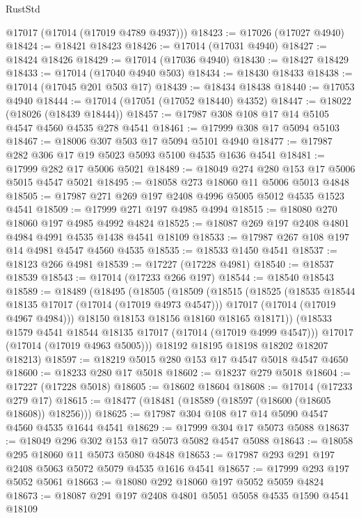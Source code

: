 \begin{lexlean}{RustStd}
\begin{coremodule}
      @17017
      (@17014 (@17019 @4789 @4937)))
@18423 := @17026 (@17027 @4940)
@18424 := @18421 @18423
@18426 := @17014 (@17031 @4940)
@18427 := @18424 @18426
@18429 := @17014 (@17036 @4940)
@18430 := @18427 @18429
@18433 := @17014 (@17040 @4940 @503)
@18434 := @18430 @18433
@18438 := @17014 (@17045 @201 @503 @17)
@18439 := @18434 @18438
@18440 := @17053 @4940
@18444 := @17014 (@17051 (@17052 @18440) @4352)
@18447 := @18022 (@18026 (@18439 @18444))
@18457 := @17987 @308 @108 @17 @14 @5105 @4547 @4560 @4535 @278 @4541
@18461 := @17999 @308 @17 @5094 @5103
@18467 := @18006 @307 @503 @17 @5094 @5101 @4940
@18477 := @17987 @282 @306 @17 @19 @5023 @5093 @5100 @4535 @1636 @4541
@18481 := @17999 @282 @17 @5006 @5021
@18489 := @18049 @274 @280 @153 @17 @5006 @5015 @4547 @5021
@18495 := @18058 @273 @18060 @11 @5006 @5013 @4848
@18505 := @17987 @271 @269 @197 @2408 @4996 @5005 @5012 @4535 @1523 @4541
@18509 := @17999 @271 @197 @4985 @4994
@18515 := @18080 @270 @18060 @197 @4985 @4992 @4824
@18525 := @18087 @269 @197 @2408 @4801 @4984 @4991 @4535 @1438 @4541 @18109
@18533 := @17987 @267 @108 @197 @14 @4981 @4547 @4560 @4535
@18535 := @18533 @1450 @4541
@18537 := @18123 @266 @4981
@18539 := @17227 (@17228 @4981)
@18540 := @18537 @18539
@18543 := @17014 (@17233 @266 @197)
@18544 := @18540 @18543
@18589 := @18489
    (@18495
      (@18505
        (@18509
          (@18515
            (@18525
              (@18535 @18544 @18135 @17017 (@17014 (@17019 @4973 @4547)))
              @17017
              (@17014 (@17019 @4967 @4984)))
            @18150
            @18153
            @18156
            @18160
            @18165
            @18171))
        (@18533 @1579 @4541 @18544 @18135 @17017 (@17014 (@17019 @4999 @4547)))
        @17017
        (@17014 (@17019 @4963 @5005)))
      @18192
      @18195
      @18198
      @18202
      @18207
      @18213)
@18597 := @18219 @5015 @280 @153 @17 @4547 @5018 @4547 @4650
@18600 := @18233 @280 @17 @5018
@18602 := @18237 @279 @5018
@18604 := @17227 (@17228 @5018)
@18605 := @18602 @18604
@18608 := @17014 (@17233 @279 @17)
@18615 := @18477 (@18481 (@18589 (@18597 (@18600 (@18605 @18608)) @18256)))
@18625 := @17987 @304 @108 @17 @14 @5090 @4547 @4560 @4535 @1644 @4541
@18629 := @17999 @304 @17 @5073 @5088
@18637 := @18049 @296 @302 @153 @17 @5073 @5082 @4547 @5088
@18643 := @18058 @295 @18060 @11 @5073 @5080 @4848
@18653 := @17987 @293 @291 @197 @2408 @5063 @5072 @5079 @4535 @1616 @4541
@18657 := @17999 @293 @197 @5052 @5061
@18663 := @18080 @292 @18060 @197 @5052 @5059 @4824
@18673 := @18087 @291 @197 @2408 @4801 @5051 @5058 @4535 @1590 @4541 @18109

\end{coremodule}
\end{lexlean}
